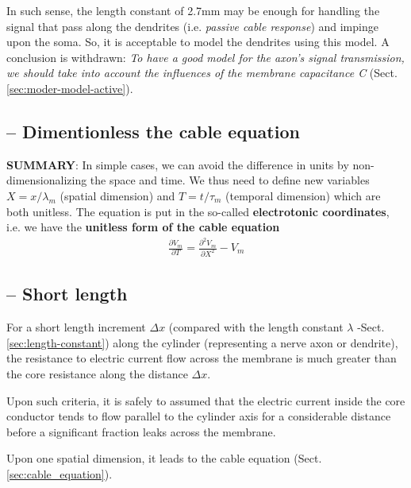 In such sense, the length constant of 2.7mm may be enough for handling
the signal that pass along the dendrites (i.e.
{\it passive cable response}) and impinge upon the soma. So, it is
acceptable to model the dendrites using this model.  A conclusion is
withdrawn: {\it To have a good model for the axon's signal transmission, we
should take into account the influences of the membrane capacitance C}
(Sect.\ref{sec:moder-model-active}).


\subsection{ -- Dimentionless the cable equation}
\label{sec:non-diment-cable}

{\bf SUMMARY}: In simple cases, we can avoid the difference in units
by non-dimensionalizing the space and time. We thus need to define new
variables $X=x/\lambda_m$ (spatial dimension) and $T=t/\tau_m$ (temporal
dimension) which are both unitless. The equation is put in the so-called
{\bf electrotonic coordinates}, i.e. we have the
{\bf unitless form of the cable equation}
\begin{eqnarray}
  \label{eq:436}
  \frac{\partial V_m}{\partial T}  =
  \frac{\partial^2V_m}{\partial X^2} - V_m
\end{eqnarray}







\subsection{-- Short length}
\label{sec:short-length}

For a short length increment $\Delta x$ (compared with the length constant
$\lambda$ -Sect.\ref{sec:length-constant}) along the cylinder (representing a
nerve axon or dendrite), the resistance to electric current flow across the
membrane is much greater than the core resistance along the distance $\Delta x$.

Upon such criteria, it is safely to assumed that the electric current inside the
core conductor tends to flow parallel to the cylinder axis for a considerable
distance before a significant fraction leaks across the membrane.

Upon one spatial dimension, it leads to the cable equation
(Sect.\ref{sec:cable_equation}).

